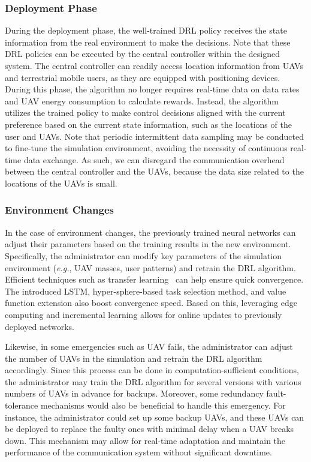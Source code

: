 \documentclass[10pt,journal,compsoc]{IEEEtran}
\begin{document}
\subsubsection{Deployment Phase}

\par During the deployment phase, the well-trained DRL policy receives the state information from the real environment to make the decisions. Note that these DRL policies can be executed by the central controller within the designed system. The central controller can readily access location information from UAVs and terrestrial mobile users, as they are equipped with positioning devices. During this phase, the algorithm no longer requires real-time data on data rates and UAV energy consumption to calculate rewards. Instead, the algorithm utilizes the trained policy to make control decisions aligned with the current preference based on the current state information, such as the locations of the user and UAVs. Note that periodic intermittent data sampling may be conducted to fine-tune the simulation environment, avoiding the necessity of continuous real-time data exchange. As such, we can disregard the communication overhead between the central controller and the UAVs, because the data size related to the locations of the UAVs is small. 

\subsubsection{Environment Changes}

\par In the case of environment changes, the previously trained neural networks can adjust their parameters based on the training results in the new environment. Specifically, the administrator can modify key parameters of the simulation environment (\textit{e.g.}, UAV masses, user patterns) and retrain the DRL algorithm. Efficient techniques such as transfer learning~\cite{Zhuang2021} can help ensure quick convergence. The introduced LSTM, hyper-sphere-based task selection method, and value function extension also boost convergence speed. Based on this, leveraging edge computing and incremental learning allows for online updates to previously deployed networks. 

\par Likewise, in some emergencies such as UAV fails, the administrator can adjust the number of UAVs in the simulation and retrain the DRL algorithm accordingly. Since this process can be done in computation-sufficient conditions, the administrator may train the DRL algorithm for several versions with various numbers of UAVs in advance for backups. Moreover, some redundancy fault-tolerance mechanisms would also be beneficial to handle this emergency. For instance, the administrator could set up some backup UAVs, and these UAVs can be deployed to replace the faulty ones with minimal delay when a UAV breaks down. This mechanism may allow for real-time adaptation and maintain the performance of the communication system without significant downtime. 
\end{document}
